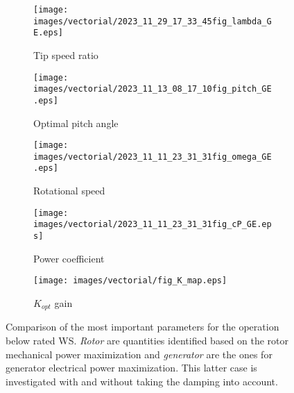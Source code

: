 \begin{figure}[!htbp]
  \begin{subfigure}{0.5\textwidth}
    \centering
    \texttt{[image: images/vectorial/2023\_11\_29\_17\_33\_45fig\_lambda\_GE.eps]}
    \caption{Tip speed ratio}
    \label{fig:2023_06_24_15_57_04fig_lambda_GE}
  \end{subfigure}
  \begin{subfigure}{0.5\textwidth}
    \centering
    \texttt{[image: images/vectorial/2023\_11\_13\_08\_17\_10fig\_pitch\_GE.eps]}
    \caption{Optimal pitch angle}
    \label{fig:2023_06_24_15_57_04fig_pitch_GE}
  \end{subfigure}
  \begin{subfigure}{0.5\textwidth}
    \centering
    \texttt{[image: images/vectorial/2023\_11\_11\_23\_31\_31fig\_omega\_GE.eps]}
    \caption{Rotational speed}
    \label{fig:2023_07_10_14_18_25fig_omega_GE}
  \end{subfigure}
  \begin{subfigure}{0.5\textwidth}
    \centering
    \texttt{[image: images/vectorial/2023\_11\_11\_23\_31\_31fig\_cP\_GE.eps]}
    \caption{Power coefficient}
    \label{fig:2023_06_24_15_57_04fig_cP_GE}
  \end{subfigure}
  \begin{subfigure}{0.5\textwidth}
    \centering
    \texttt{[image: images/vectorial/fig\_K\_map.eps]}
    \caption{$K_{opt}$ gain}
    \label{fig:fig_K_map}
  \end{subfigure}
  \caption{Comparison of the most important parameters for the operation below rated WS. \textit{Rotor} are quantities identified based on the rotor mechanical power maximization and \textit{generator} are the ones for generator electrical power maximization. This latter case is investigated with and without taking the damping into account.}
  \label{fig:parameters_for_below_rated}
\end{figure}

